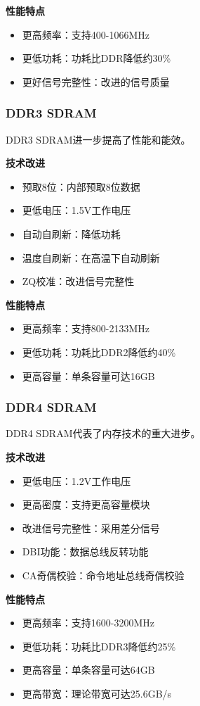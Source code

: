 \documentclass{article}
\begin{document}
\textbf{性能特点}
\begin{itemize}
    \item 更高频率：支持400-1066MHz
    \item 更低功耗：功耗比DDR降低约30\%
    \item 更好信号完整性：改进的信号质量
\end{itemize}

\subsubsection{DDR3 SDRAM}

DDR3 SDRAM进一步提高了性能和能效。

\textbf{技术改进}
\begin{itemize}
    \item 预取8位：内部预取8位数据
    \item 更低电压：1.5V工作电压
    \item 自动自刷新：降低功耗
    \item 温度自刷新：在高温下自动刷新
    \item ZQ校准：改进信号完整性
\end{itemize}

\textbf{性能特点}
\begin{itemize}
    \item 更高频率：支持800-2133MHz
    \item 更低功耗：功耗比DDR2降低约40\%
    \item 更高容量：单条容量可达16GB
\end{itemize}

\subsubsection{DDR4 SDRAM}

DDR4 SDRAM代表了内存技术的重大进步。

\textbf{技术改进}
\begin{itemize}
    \item 更低电压：1.2V工作电压
    \item 更高密度：支持更高容量模块
    \item 改进信号完整性：采用差分信号
    \item DBI功能：数据总线反转功能
    \item CA奇偶校验：命令地址总线奇偶校验
\end{itemize}

\textbf{性能特点}
\begin{itemize}
    \item 更高频率：支持1600-3200MHz
    \item 更低功耗：功耗比DDR3降低约25\%
    \item 更高容量：单条容量可达64GB
    \item 更高带宽：理论带宽可达25.6GB/s
\end{itemize}
\end{document}
